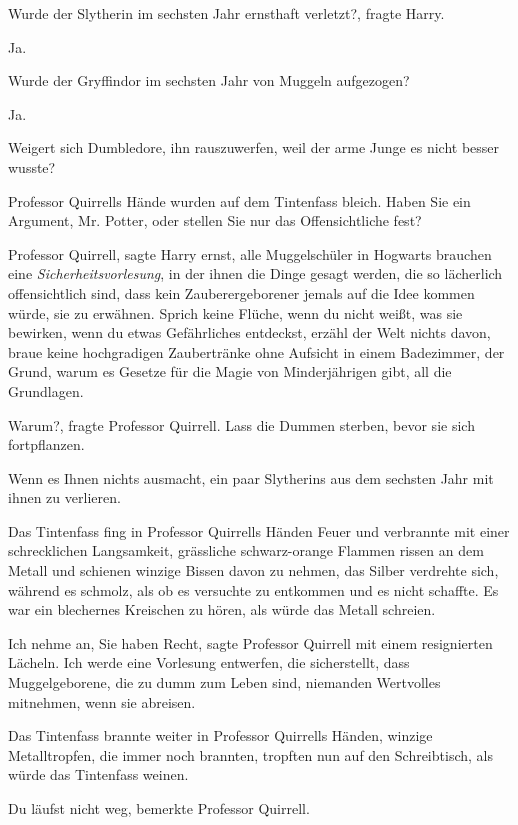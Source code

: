 \glqq{}Wurde der Slytherin im sechsten Jahr ernsthaft verletzt?\grqq{}, fragte
Harry.

\glqq{}Ja.\grqq{}

\glqq{}Wurde der Gryffindor im sechsten Jahr von Muggeln aufgezogen?\grqq{}

\glqq{}Ja.\grqq{}

\glqq{}Weigert sich Dumbledore, ihn rauszuwerfen, weil der arme Junge es nicht
besser wusste?\grqq{}

Professor Quirrells Hände wurden auf dem Tintenfass bleich. \glqq{}Haben Sie ein
Argument, Mr. Potter, oder stellen Sie nur das Offensichtliche fest?\grqq{}

\glqq{}Professor Quirrell\grqq{}, sagte Harry ernst, \glqq{}alle Muggelschüler
in Hogwarts brauchen eine \emph{Sicherheitsvorlesung}, in der ihnen die Dinge
gesagt werden, die so lächerlich offensichtlich sind, dass kein
Zauberergeborener jemals auf die Idee kommen würde, sie zu erwähnen. Sprich
keine Flüche, wenn du nicht weißt, was sie bewirken, wenn du etwas Gefährliches
entdeckst, erzähl der Welt nichts davon, braue keine hochgradigen Zaubertränke
ohne Aufsicht in einem Badezimmer, der Grund, warum es Gesetze für die Magie von
Minderjährigen gibt, all die Grundlagen.\grqq{}

\glqq{}Warum?\grqq{}, fragte Professor Quirrell. \glqq{}Lass die Dummen sterben,
bevor sie sich fortpflanzen.\grqq{}

\glqq{}Wenn es Ihnen nichts ausmacht, ein paar Slytherins aus dem sechsten Jahr
mit ihnen zu verlieren.\grqq{}

Das Tintenfass fing in Professor Quirrells Händen Feuer und verbrannte mit einer
schrecklichen Langsamkeit, grässliche schwarz-orange Flammen rissen an dem
Metall und schienen winzige Bissen davon zu nehmen, das Silber verdrehte sich,
während es schmolz, als ob es versuchte zu entkommen und es nicht schaffte. Es
war ein blechernes Kreischen zu hören, als würde das Metall schreien.

\glqq{}Ich nehme an, Sie haben Recht\grqq{}, sagte Professor Quirrell mit einem
resignierten Lächeln. \glqq{}Ich werde eine Vorlesung entwerfen, die
sicherstellt, dass Muggelgeborene, die zu dumm zum Leben sind, niemanden
Wertvolles mitnehmen, wenn sie abreisen.\grqq{}

Das Tintenfass brannte weiter in Professor Quirrells Händen, winzige
Metalltropfen, die immer noch brannten, tropften nun auf den Schreibtisch, als
würde das Tintenfass weinen.

\glqq{}Du läufst nicht weg\grqq{}, bemerkte Professor Quirrell.

